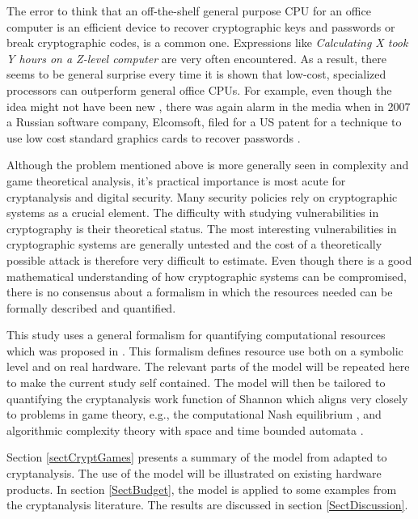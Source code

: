 \documentclass{article}
\begin{document}
The error to think that an off-the-shelf general purpose CPU for an office 
computer is an efficient device to recover cryptographic keys and passwords or
break cryptographic codes, is a common one. Expressions like
\textit{Calculating X took Y hours on a Z-level computer} are very 
often encountered. As a result, there seems to be general surprise every time
it is shown that low-cost, specialized processors can outperform general office
CPUs. For example, even though the idea might not have been new \cite{CookBK05}, there 
was again alarm in the media when in 2007 a Russian software company, Elcomsoft, filed for a 
US patent for a technique to use low cost standard graphics cards to recover passwords
\cite{HelpNetSecurity2007}.

Although the problem mentioned above is more generally seen in complexity and game theoretical 
analysis, it's practical importance is most acute for cryptanalysis and digital security.
Many security policies rely on cryptographic systems as a crucial element.
The difficulty with studying vulnerabilities in cryptography is their theoretical 
status. The most interesting vulnerabilities in cryptographic systems are generally 
untested and the cost of a theoretically possible attack is therefore very difficult to
estimate. Even though there is a good mathematical understanding of how
cryptographic systems can be compromised, there is no consensus about a
formalism in which the resources needed can be formally described and
quantified.

This study uses a general formalism for quantifying computational resources 
which was proposed in \cite{Son0911-5262}. This formalism defines resource use 
both on a symbolic level and on real hardware. The relevant parts 
of the model will be repeated here to make the current study self contained.
The model will then be tailored to quantifying the cryptanalysis 
work function of Shannon \cite{Shannon1949} which aligns very closely to problems 
in game theory, e.g., the computational Nash equilibrium 
\cite{Halpern-2008,HalpernPass-2008}, and algorithmic complexity theory with space 
and time bounded automata \cite{daylight-2008}.

Section  \ref{sectCryptGames} presents a summary of the model from \cite{Son0911-5262}
adapted to cryptanalysis. The use of the model will be illustrated 
on existing hardware products. In section \ref{SectBudget}, the model is applied to 
some examples from the cryptanalysis literature. The results are discussed in section
\ref{SectDiscussion}.
\end{document}
